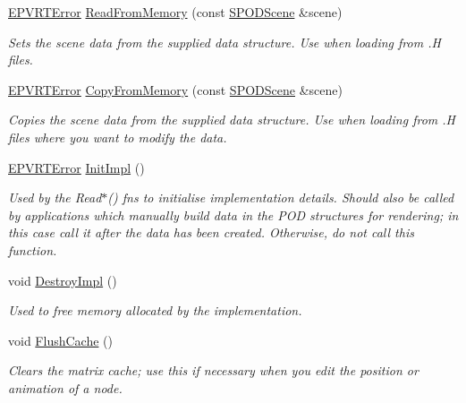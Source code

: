 \begin{DoxyCompactItemize}
\hyperlink{_p_v_r_t_error_8h_a9e837ff1a83f3a5f332bc4cc78454608}{E\+P\+V\+R\+T\+Error} \hyperlink{class_c_p_v_r_t_model_p_o_d_a860063835e46583b704c53069a70483c}{Read\+From\+Memory} (const \hyperlink{struct_s_p_o_d_scene}{S\+P\+O\+D\+Scene} \&scene)
\begin{DoxyCompactList}\small\item\em Sets the scene data from the supplied data structure. Use when loading from .H files. \end{DoxyCompactList}\item 
\hyperlink{_p_v_r_t_error_8h_a9e837ff1a83f3a5f332bc4cc78454608}{E\+P\+V\+R\+T\+Error} \hyperlink{class_c_p_v_r_t_model_p_o_d_af8b1b565dbe71e343fd36828772015fa}{Copy\+From\+Memory} (const \hyperlink{struct_s_p_o_d_scene}{S\+P\+O\+D\+Scene} \&scene)
\begin{DoxyCompactList}\small\item\em Copies the scene data from the supplied data structure. Use when loading from .H files where you want to modify the data. \end{DoxyCompactList}\item 
\hyperlink{_p_v_r_t_error_8h_a9e837ff1a83f3a5f332bc4cc78454608}{E\+P\+V\+R\+T\+Error} \hyperlink{class_c_p_v_r_t_model_p_o_d_abd91acfb4ab05f3f7c8f5e25363bfb42}{Init\+Impl} ()
\begin{DoxyCompactList}\small\item\em Used by the Read$\ast$() fns to initialise implementation details. Should also be called by applications which manually build data in the P\+O\+D structures for rendering; in this case call it after the data has been created. Otherwise, do not call this function. \end{DoxyCompactList}\item 
void \hyperlink{class_c_p_v_r_t_model_p_o_d_a8360f69bbc97d1d74fc327cc1e84c47e}{Destroy\+Impl} ()
\begin{DoxyCompactList}\small\item\em Used to free memory allocated by the implementation. \end{DoxyCompactList}\item 
void \hyperlink{class_c_p_v_r_t_model_p_o_d_a7ddd6d1c03dce50baf7a89323147e37e}{Flush\+Cache} ()
\begin{DoxyCompactList}\small\item\em Clears the matrix cache; use this if necessary when you edit the position or animation of a node. \end{DoxyCompactList}\item 

\end{DoxyCompactItemize}

